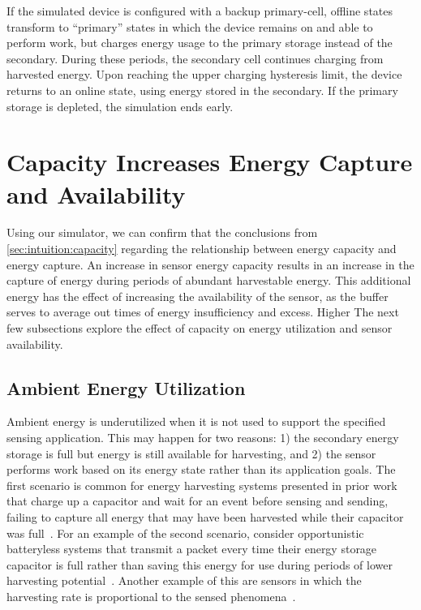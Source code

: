If the simulated device is configured with a backup primary-cell, offline
states transform to ``primary'' states in which the device remains on and
able to perform work, but charges energy usage to the primary storage instead
of the secondary. During these periods, the secondary cell continues charging
from harvested energy. Upon reaching the upper charging hysteresis
limit, the device returns to an online state, using energy stored in the
secondary.  If the primary storage is depleted, the simulation ends early.


\section{Capacity Increases Energy Capture and Availability}
\label{sec:capacity:capture}

Using our simulator, we can confirm that the conclusions 
from \cref{sec:intuition:capacity}
regarding the relationship between energy capacity and energy capture. 
An increase in sensor energy capacity results in an increase in the capture of energy during periods of abundant harvestable energy.
This additional energy has the effect of increasing the availability of the sensor, as the buffer serves to average out times of energy insufficiency and excess.
Higher
The next few subsections explore the effect of capacity on energy utilization and sensor availability.

\subsection{Ambient Energy Utilization}
\label{sec:capacity:utilization}

Ambient energy is underutilized when it is not used to support the specified
sensing application. This may happen for two reasons: 1) 
the secondary
energy storage is full but energy is still available for harvesting, and 2) the
sensor performs work based on its energy state rather than its application
goals. The first scenario is common for energy harvesting systems
presented in prior work that charge up a capacitor and wait for an event
before sensing and sending, failing to capture all energy that may
have been harvested while their capacitor was full~\cite{campbellEnergy14, afanasov2020battery}.
For an example of the second scenario, consider opportunistic batteryless
systems that transmit a packet every time their energy storage capacitor
is full rather than saving this energy for use during periods of lower harvesting
potential~\cite{hesterFlicker17, colinReconfigurable18}. Another example of this are sensors in which the harvesting
rate is proportional to the sensed phenomena~\cite{debruin2013monjolo}.

